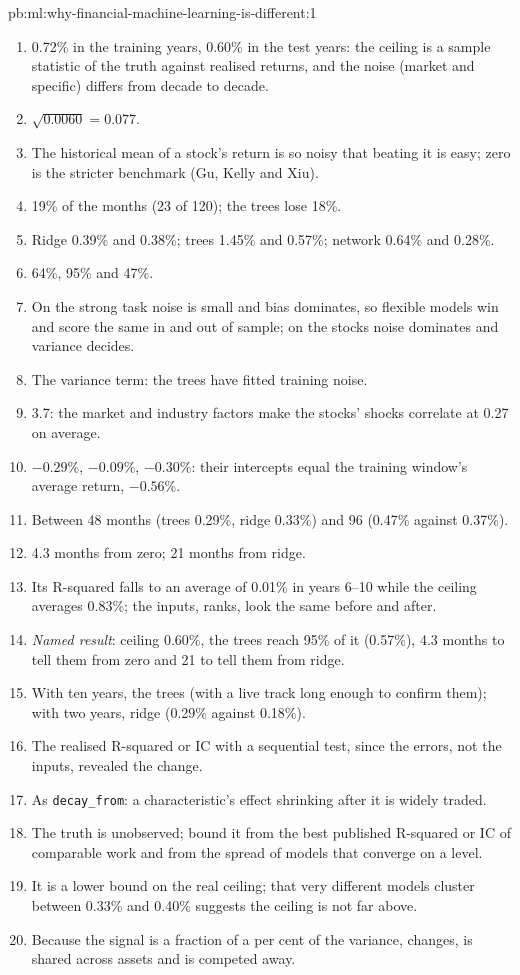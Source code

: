\begin{solution}{pb:ml:why-financial-machine-learning-is-different:1}
\begin{enumerate}
\item 0.72\% in the training years, 0.60\% in the test years: the ceiling is a sample statistic of the truth against
realised returns, and the noise (market and specific) differs from decade to decade.
\item $\sqrt{0.0060} = 0.077$.
\item The historical mean of a stock's return is so noisy that beating it is easy; zero is the stricter benchmark (Gu,
Kelly and Xiu).
\item 19\% of the months (23 of 120); the trees lose 18\%.
\item Ridge 0.39\% and 0.38\%; trees 1.45\% and 0.57\%; network 0.64\% and 0.28\%.
\item 64\%, 95\% and 47\%.
\item On the strong task noise is small and bias dominates, so flexible models win and score the same in and out of
sample; on the stocks noise dominates and variance decides.
\item The variance term: the trees have fitted training noise.
\item 3.7: the market and industry factors make the stocks' shocks correlate at 0.27 on average.
\item $-0.29\%$, $-0.09\%$, $-0.30\%$: their intercepts equal the training window's average return, $-0.56\%$.
\item Between 48 months (trees 0.29\%, ridge 0.33\%) and 96 (0.47\% against 0.37\%).
\item 4.3 months from zero; 21 months from ridge.
\item Its R-squared falls to an average of 0.01\% in years 6--10 while the ceiling averages 0.83\%; the inputs, ranks,
look the same before and after.
\item \emph{Named result}: ceiling 0.60\%, the trees reach 95\% of it (0.57\%), 4.3 months to tell them from zero and 21
to tell them from ridge.
\item With ten years, the trees (with a live track long enough to confirm them); with two years, ridge (0.29\% against
0.18\%).
\item The realised R-squared or IC with a sequential test, since the errors, not the inputs, revealed the change.
\item As \texttt{decay\_from}: a characteristic's effect shrinking after it is widely traded.
\item The truth is unobserved; bound it from the best published R-squared or IC of comparable work and from the
spread of models that converge on a level.
\item It is a lower bound on the real ceiling; that very different models cluster between 0.33\% and 0.40\% suggests the
ceiling is not far above.
\item Because the signal is a fraction of a per cent of the variance, changes, is shared across assets and is competed
away.
\end{enumerate}
\end{solution}

